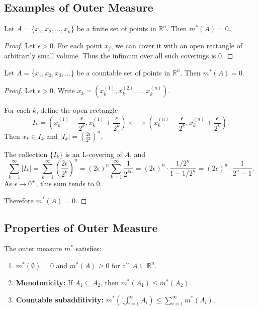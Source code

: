 \documentclass[11pt]{report}
\begin{document}
\subsection{Examples of Outer Measure}

\begin{exbox}
Let $A = \{x_1, x_2, \ldots, x_k\}$ be a finite set of points in $\mathbb{R}^n$. Then $m^*(A) = 0$.
\end{exbox}

\begin{proof}
Let $\epsilon > 0$. For each point $x_j$, we can cover it with an open rectangle of arbitrarily small volume. Thus the infimum over all such coverings is $0$.
\end{proof}

\begin{exbox}
Let $A = \{x_1, x_2, x_3, \ldots\}$ be a countable set of points in $\mathbb{R}^n$. Then $m^*(A) = 0$.
\end{exbox}

\begin{proof}
Let $\epsilon > 0$. Write $x_k = (x_k^{(1)}, x_k^{(2)}, \ldots, x_k^{(n)})$.

For each $k$, define the open rectangle
\[
I_k = \left( x_k^{(1)} - \frac{\epsilon}{2^k}, x_k^{(1)} + \frac{\epsilon}{2^k} \right) \times \cdots \times \left( x_k^{(n)} - \frac{\epsilon}{2^k}, x_k^{(n)} + \frac{\epsilon}{2^k} \right).
\]
Then $x_k \in I_k$ and $|I_k| = \left( \frac{2\epsilon}{2^k} \right)^n$.

The collection $\{I_k\}$ is an L-covering of $A$, and
\[
\sum_{k=1}^{\infty} |I_k| = \sum_{k=1}^{\infty} \left( \frac{2\epsilon}{2^k} \right)^n = (2\epsilon)^n \sum_{k=1}^{\infty} \frac{1}{2^{kn}} = (2\epsilon)^n \cdot \frac{1/2^n}{1 - 1/2^n} = (2\epsilon)^n \cdot \frac{1}{2^n - 1}.
\]
As $\epsilon \to 0^+$, this sum tends to $0$.

Therefore $m^*(A) = 0$.
\end{proof}

\subsection{Properties of Outer Measure}

\begin{propbox}
The outer measure $m^*$ satisfies:
\begin{enumerate}
    \item $m^*(\emptyset) = 0$ and $m^*(A) \geq 0$ for all $A \subseteq \mathbb{R}^n$.
    \item \textbf{Monotonicity:} If $A_1 \subseteq A_2$, then $m^*(A_1) \leq m^*(A_2)$.
    \item \textbf{Countable subadditivity:} $m^*\left( \bigcup_{i=1}^{\infty} A_i \right) \leq \sum_{i=1}^{\infty} m^*(A_i)$.
\end{enumerate}
\end{propbox}
\end{document}
